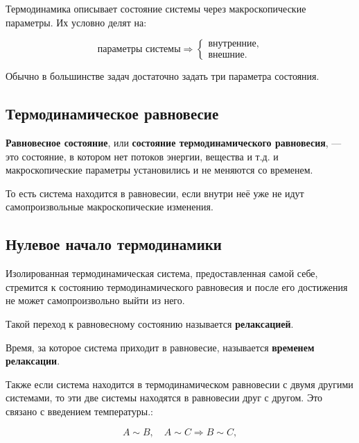 \documentclass[a4paper,12pt]{article}
\begin{document}
Термодинамика описывает состояние системы через макроскопические параметры. Их условно делят на:

\[
\text{параметры системы}
\Rightarrow
\begin{cases}
\text{внутренние},\\
\text{внешние}.
\end{cases}
\]

Обычно в большинстве задач достаточно задать три параметра состояния.

\subsection*{Термодинамическое равновесие}

\begin{definitionbox}
\textbf{Равновесное состояние}, или \textbf{состояние термодинамического равновесия}, — это состояние, в котором нет потоков энергии, вещества и т.д. и макроскопические параметры установились и не меняются со временем.
\end{definitionbox}

То есть система находится в равновесии, если внутри неё уже не идут самопроизвольные макроскопические изменения.

\subsection*{Нулевое начало термодинамики}

\begin{theorembox}
Изолированная термодинамическая система, предоставленная самой себе, стремится к состоянию термодинамического равновесия и после его достижения не может самопроизвольно выйти из него.
\end{theorembox}

\begin{definitionbox}
Такой переход к равновесному состоянию называется \textbf{релаксацией}.
\end{definitionbox}

\begin{definitionbox}
Время, за которое система приходит в равновесие, называется \textbf{временем релаксации}.
\end{definitionbox}

Также если система находится в термодинамическом равновесии с двумя другими системами, то эти две системы находятся в равновесии друг с другом. Это связано с введением температуры.:

\[
A \sim B,\quad A \sim C
\Rightarrow
B \sim C,
\]
 
\end{document}
